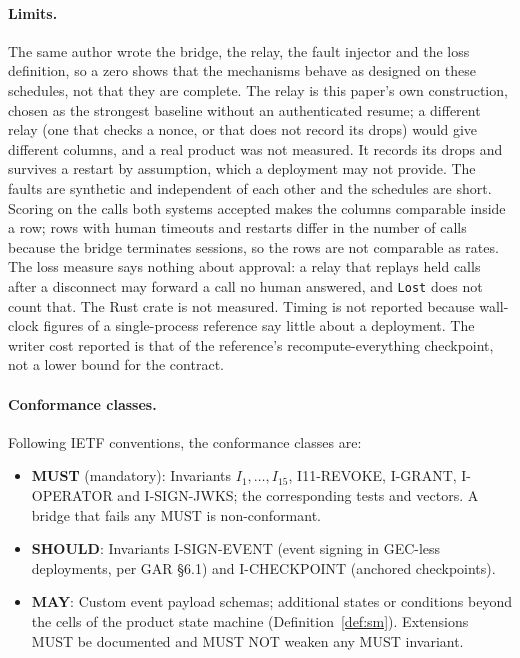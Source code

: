 \paragraph{Limits.} The same author wrote the bridge, the relay, the
fault injector and the loss definition, so a zero shows that the
mechanisms behave as designed on these schedules, not that they are
complete. The relay is this paper's own construction, chosen as the
strongest baseline without an authenticated resume; a different relay (one
that checks a nonce, or that does not record its drops) would give
different columns, and a real product was not measured. It records its
drops and survives a restart by assumption, which a deployment may not
provide. The faults are synthetic and independent of each other and the
schedules are short. Scoring on the calls both systems accepted makes
the columns comparable inside a row; rows with human timeouts and restarts
differ in the number of calls because the bridge terminates sessions, so the
rows are not comparable as rates. The loss measure says nothing about
approval: a relay that replays held calls after a disconnect may forward
a call no human answered, and \texttt{Lost} does not count that. The Rust
crate is not measured. Timing is not
reported because wall-clock figures of a single-process reference say little
about a deployment. The writer cost reported is that of the reference's
recompute-everything checkpoint, not a lower bound for the contract.

\paragraph{Conformance classes.} Following IETF conventions, the
conformance classes are:

\begin{itemize}[leftmargin=2em]
\item \textbf{MUST} (mandatory): Invariants $I_1, \ldots, I_{15}$,
I11-REVOKE, I-GRANT, I-OPERATOR and I-SIGN-JWKS; the corresponding tests and vectors. A bridge that fails any
MUST is non-conformant.
\item \textbf{SHOULD}: Invariants I-SIGN-EVENT (event signing in
GEC-less deployments, per GAR \S 6.1) and I-CHECKPOINT (anchored
checkpoints).
\item \textbf{MAY}: Custom event payload schemas; additional states or
conditions beyond the cells of the product state machine
(Definition~\ref{def:sm}). Extensions MUST be documented and MUST
NOT weaken any MUST invariant.
\end{itemize}


